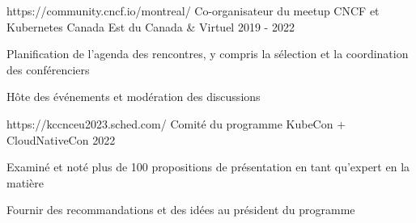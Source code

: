 
\begin{cventries}

  \cventry
    {https://community.cncf.io/montreal/} %
    {Co-organisateur du meetup CNCF et Kubernetes Canada} %
    {Est du Canada \& Virtuel} %
    {2019 - 2022} %
    {
      \begin{cvitems} %
        \item {Planification de l'agenda des rencontres, y compris la sélection et la coordination des conférenciers}
        \item {Hôte des événements et modération des discussions}
      \end{cvitems}
    }

  \cventry
    {https://kccnceu2023.sched.com/} %
    {Comité du programme KubeCon + CloudNativeCon} %
    {} %
    {2022} %
    {
      \begin{cvitems} %
        \item {Examiné et noté plus de 100 propositions de présentation en tant qu'expert en la matière}
        \item {Fournir des recommandations et des idées au président du programme}
      \end{cvitems}
    }

\end{cventries}